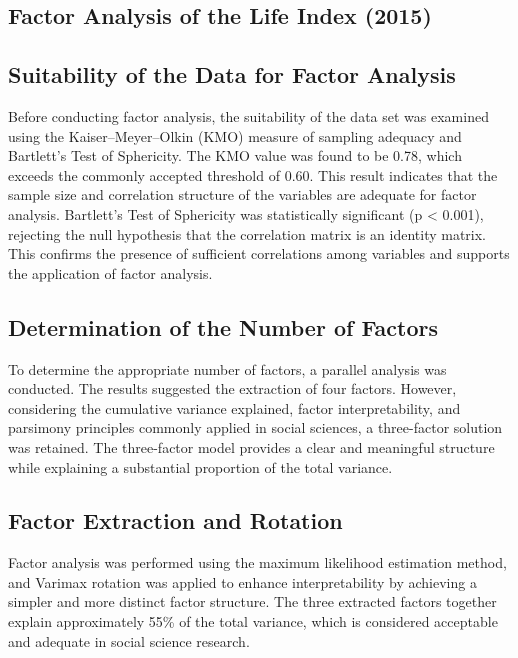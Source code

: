 \documentclass[
]{article}
\begin{document}
\subsection{Factor Analysis of the Life Index
(2015)}\label{factor-analysis-of-the-life-index-2015}

\subsection{Suitability of the Data for Factor
Analysis}\label{suitability-of-the-data-for-factor-analysis}

Before conducting factor analysis, the suitability of the data set was
examined using the Kaiser--Meyer--Olkin (KMO) measure of sampling
adequacy and Bartlett's Test of Sphericity. The KMO value was found to
be 0.78, which exceeds the commonly accepted threshold of 0.60. This
result indicates that the sample size and correlation structure of the
variables are adequate for factor analysis. Bartlett's Test of
Sphericity was statistically significant (p \textless{} 0.001),
rejecting the null hypothesis that the correlation matrix is an identity
matrix. This confirms the presence of sufficient correlations among
variables and supports the application of factor analysis.

\subsection{Determination of the Number of
Factors}\label{determination-of-the-number-of-factors}

To determine the appropriate number of factors, a parallel analysis was
conducted. The results suggested the extraction of four factors.
However, considering the cumulative variance explained, factor
interpretability, and parsimony principles commonly applied in social
sciences, a three-factor solution was retained. The three-factor model
provides a clear and meaningful structure while explaining a substantial
proportion of the total variance.

\subsection{Factor Extraction and
Rotation}\label{factor-extraction-and-rotation}

Factor analysis was performed using the maximum likelihood estimation
method, and Varimax rotation was applied to enhance interpretability by
achieving a simpler and more distinct factor structure. The three
extracted factors together explain approximately 55\% of the total
variance, which is considered acceptable and adequate in social science
research.
\end{document}
